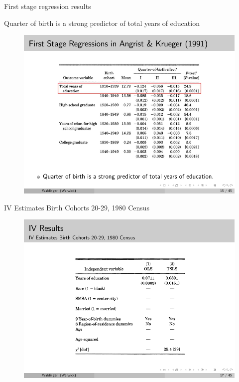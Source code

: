 \documentclass{beamer}
\begin{document}
\begin{frame}{First stage regression results}

	 Quarter of birth is a strong predictor of total years of education
	
	\begin{figure}
	\includegraphics{./lecture_includes/qob_5.pdf}
	\end{figure}

\end{frame}




\begin{frame}{IV Estimates Birth Cohorts 20-29, 1980 Census}
	
	\begin{figure}
	\includegraphics{./lecture_includes/qob_7.pdf}
	\end{figure}
	
\end{frame}
\end{document}
